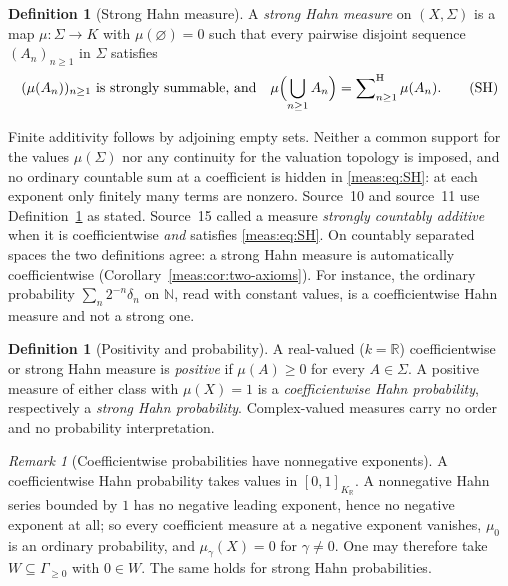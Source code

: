 \documentclass[11pt]{article}
\numberwithin{equation}{section}
\theoremstyle{definition}
\newtheorem{definition}[theorem]{Definition}
\theoremstyle{remark}
\newtheorem{remark}[theorem]{Remark}
\newcommand{\R}{\mathbb R}
\newcommand{\N}{\mathbb N}
\newcommand{\KR}{K_{\R}}
\newcommand{\hsum}{\mathop{\sum}\nolimits^{\mathrm H}}
\begin{document}
\begin{definition}[Strong Hahn measure]\label{meas:def:strong}
A \emph{strong Hahn measure} on $(X,\Sigma)$ is a map $\mu:\Sigma\to K$ with
$\mu(\varnothing)=0$ such that every pairwise disjoint sequence $(A_n)_{n\ge1}$
in $\Sigma$ satisfies
\begin{equation}\label{meas:eq:SH}
 (\mu(A_n))_{n\ge1}\ \text{is strongly summable, and}\quad
 \mu\Bigl(\bigcup_{n\ge1}A_n\Bigr)=\hsum_{n\ge1}\mu(A_n).
 \tag{SH}
\end{equation}
\end{definition}

Finite additivity follows by adjoining empty sets. Neither a common support
for the values $\mu(\Sigma)$ nor any continuity for the valuation topology is
imposed, and no ordinary countable sum at a coefficient is hidden in
\eqref{meas:eq:SH}: at each exponent only finitely many terms are nonzero.
Source~10 and source~11 use Definition~\ref{meas:def:strong} as stated. Source~15
called a measure \emph{strongly countably additive} when it is coefficientwise
\emph{and} satisfies \eqref{meas:eq:SH}. On countably separated spaces the two
definitions agree: a strong Hahn measure is automatically coefficientwise
(Corollary~\ref{meas:cor:two-axioms}). For instance, the ordinary probability
$\sum_n2^{-n}\delta_n$ on $\N$, read with constant values, is a coefficientwise
Hahn measure and not a strong one.

\begin{definition}[Positivity and probability]\label{meas:def:positive}
A real-valued ($k=\R$) coefficientwise or strong Hahn measure is
\emph{positive} if $\mu(A)\ge0$ for every $A\in\Sigma$. A positive measure of
either class with $\mu(X)=1$ is a \emph{coefficientwise Hahn probability},
respectively a \emph{strong Hahn probability}. Complex-valued measures carry
no order and no probability interpretation.
\end{definition}

\begin{remark}[Coefficientwise probabilities have nonnegative exponents]
\label{meas:rem:probability-exponents}
A coefficientwise Hahn probability takes values in $[0,1]_{\KR}$. A
nonnegative Hahn series bounded by $1$ has no negative leading exponent, hence
no negative exponent at all; so every coefficient measure at a negative
exponent vanishes, $\mu_0$ is an ordinary probability, and $\mu_\gamma(X)=0$ for
$\gamma\ne0$. One may therefore take $W\subseteq\Gamma_{\ge0}$ with $0\in W$.
The same holds for strong Hahn probabilities.
\end{remark}
\end{document}
